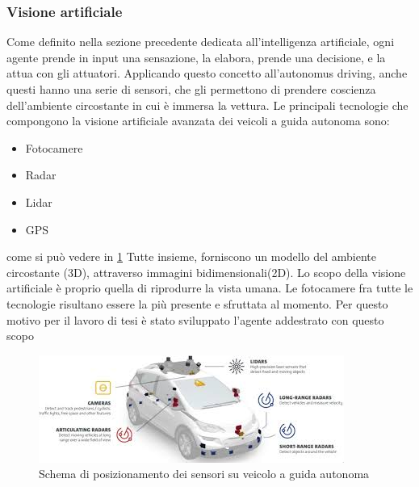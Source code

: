 \documentclass[14pt]{extarticle}
\begin{document}
\subsubsection{Visione artificiale}
Come definito nella sezione precedente dedicata all'intelligenza artificiale, ogni agente prende in input una sensazione, la elabora, prende una decisione, e la attua con gli attuatori. Applicando questo concetto all'autonomus driving, anche questi hanno una serie di sensori, che gli permettono di prendere coscienza dell'ambiente circostante in cui è immersa la vettura.
Le principali tecnologie che compongono la visione artificiale avanzata dei veicoli a guida autonoma sono\cite{das2018risk}:
\begin{itemize}
\item Fotocamere
\item Radar
\item Lidar
\item GPS
\end{itemize}
 come si può vedere in \ref{fig:maga}
Tutte insieme, forniscono un modello del ambiente circostante (3D),  attraverso immagini bidimensionali(2D).
Lo scopo della visione artificiale è proprio quella di riprodurre la vista umana.\cite{wiki:visart}
Le fotocamere fra tutte le tecnologie risultano essere la più presente e sfruttata al momento. Per questo motivo per il lavoro di tesi è stato sviluppato l'agente addestrato con questo scopo
\begin{figure}
\centering
\includegraphics[scale=0.8]{maga.jpeg}
\caption{Schema di posizionamento dei sensori su veicolo a guida autonoma}
\label{fig:maga}
\end{figure}
\end{document}
